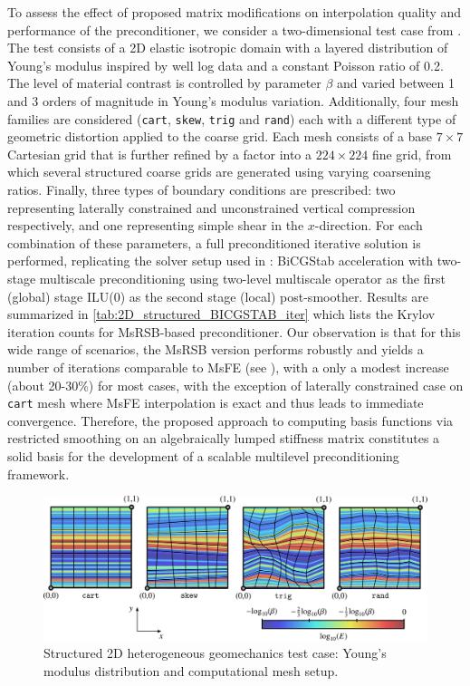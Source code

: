 To assess the effect of proposed matrix modifications on interpolation quality and performance of the preconditioner, we consider a two-dimensional test case from \cite{Castelletto2017}.   The test consists of a 2D elastic isotropic domain with a layered distribution of Young's modulus inspired by well log data and a constant Poisson ratio of 0.2.   The level of material contrast is controlled by parameter $\beta$ and varied between 1 and 3 orders of magnitude in Young's modulus variation.   Additionally, four mesh families are considered (\texttt{cart}, \texttt{skew}, \texttt{trig} and \texttt{rand}) each with a different type of geometric distortion applied to the coarse grid.   Each mesh consists of a base $7 \times 7$ Cartesian grid that is further refined by a factor into a $224 \times 224$ fine grid, from which several structured coarse grids are generated using varying coarsening ratios.   Finally, three types of boundary conditions are prescribed: two representing laterally constrained and unconstrained vertical compression respectively, and one representing simple shear in the $x$-direction.   For each combination of these parameters, a full preconditioned iterative solution is performed, replicating the solver setup used in \cite{Castelletto2017}: BiCGStab acceleration with two-stage multiscale preconditioning using two-level multiscale operator as the first (global) stage ILU(0) as the second stage (local) post-smoother.   Results are summarized in \autoref{tab:2D_structured_BICGSTAB_iter} which lists the Krylov iteration counts for MsRSB-based preconditioner.   Our observation is that for this wide range of scenarios, the MsRSB version performs robustly and yields a number of iterations comparable to MsFE (see \cite{Castelletto2017}), with a only a modest increase (about 20-30\%) for most cases, with the exception of laterally constrained case on \texttt{cart} mesh where MsFE interpolation is exact and thus leads to immediate convergence.   Therefore, the proposed approach to computing basis functions via restricted smoothing on an algebraically lumped stiffness matrix constitutes a solid basis for the development of a scalable multilevel preconditioning framework.

\begin{figure}[htbp]
    \centering
    \includegraphics[width=\textwidth]{figs/2D_structured_young}
    \caption[Structured 2D heterogeneous geomechanics test case]{Structured 2D heterogeneous geomechanics test case: Young's modulus distribution and computational mesh setup.}
    \label{fig:2D_structured_young}
\end{figure}


